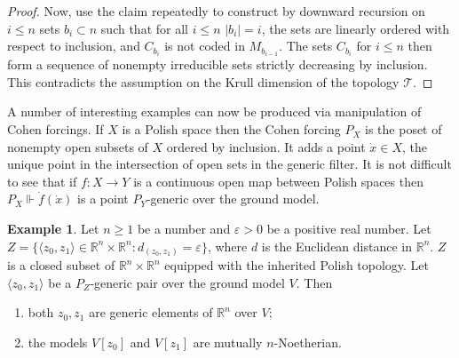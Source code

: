 \documentclass{article}
\newcommand{\eps}{\varepsilon}
\theoremstyle{definition}
\newtheorem{example}[theorem]{Example}
\begin{document}
\begin{proof}
\noindent Now, use the claim repeatedly to construct by downward recursion on $i\leq n$ sets $b_i\subset n$ such that for all $i\leq n$ $|b_i|=i$, the sets are linearly ordered with respect to inclusion, and $C_{b_i}$ is not coded in $M_{b_{i-1}}$. The sets $C_{b_i}$ for $i\leq n$ then form a sequence of nonempty irreducible sets strictly decreasing by inclusion. This contradicts the assumption on the Krull dimension of the topology $\mathcal{T}$.
\end{proof}

\noindent A number of interesting examples can now be produced via manipulation of Cohen forcings. If $X$ is a Polish space then the Cohen forcing $P_X$ is the poset of nonempty open subsets of $X$ ordered by inclusion. It adds a point $\dot x\in X$, the unique point in the intersection of open sets in the generic filter. It is not difficult to see \cite[Proposition 3.1.1]{z:geometric} that if $f\colon X\to Y$ is a continuous open map between Polish spaces then $P_X\Vdash\dot f(\dot x)$ is a point $P_Y$-generic over the ground model.


\begin{example}
\label{mainexample}
Let $n\geq 1$ be a number and $\eps>0$ be a positive real number. Let $Z=\{\langle z_0, z_1\rangle\in\mathbb{R}^n\times\mathbb{R}^n\colon d_(z_0, z_1)=\eps\}$, where $d$ is the Euclidean distance in $\mathbb{R}^n$. $Z$ is a closed subset of $\mathbb{R}^n\times\mathbb{R}^n$ equipped with the inherited Polish topology. Let $\langle z_0, z_1\rangle$ be a $P_{Z}$-generic pair over the ground model $V$. Then

\begin{enumerate}
\item both $z_0, z_1$ are generic elements of $\mathbb{R}^n$ over $V$;
\item the models $V[z_0]$ and $V[z_1]$ are mutually $n$-Noetherian.
\end{enumerate}
\end{example}
\end{document}
